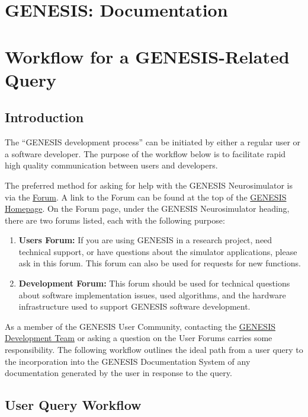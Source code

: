 \documentclass[12pt]{article}
\begin{document}
\section*{GENESIS: Documentation}

\section*{Workflow for a GENESIS-Related Query}

\subsection*{Introduction}

The ``GENESIS development process'' can be initiated by either a
regular user or a software developer. The purpose of the workflow
below is to facilitate rapid high quality communication between users
and developers.

The preferred method for asking for help with the GENESIS
Neurosimulator is via the
\href{http://www.genesis-sim.org/forum}{Forum}.  A link to the Forum
can be found at the top of the
\href{http://www.genesis-sim.org/}{GENESIS Homepage}.  On the Forum
page, under the GENESIS Neurosimulator heading, there are two forums
listed, each with the following purpose:

\begin{enumerate}
\item {\bf Users Forum:} If you are using GENESIS in a research
  project, need technical support, or have questions about the
  simulator applications, please ask in this forum.  This forum can
  also be used for requests for new functions.
\item {\bf Development Forum:} This forum should be used for technical
  questions about software implementation issues, used algorithms, and
  the hardware infrastructure used to support GENESIS software
  development.
\end{enumerate}

As a member of the GENESIS User Community, contacting the
\href{http://www.genesis-sim.org/contact}{GENESIS Development Team} or
asking a question on the User Forums carries some responsibility. The
following workflow outlines the ideal path from a user query to the
incorporation into the GENESIS Documentation System of any
documentation generated by the user in response to the query.

\subsection*{User Query Workflow}
\end{document}
